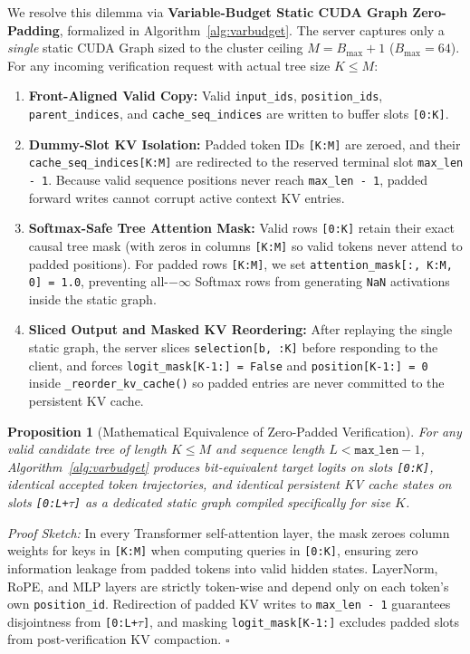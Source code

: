 \documentclass[10pt,conference]{IEEEtran}
\newtheorem{proposition}{Proposition}
\begin{document}
We resolve this dilemma via \textbf{Variable-Budget Static CUDA Graph Zero-Padding}, formalized in Algorithm~\ref{alg:varbudget}. The server captures only a \emph{single} static CUDA Graph sized to the cluster ceiling $M = B_{\max} + 1$ ($B_{\max}{=}64$). For any incoming verification request with actual tree size $K \le M$:
\begin{enumerate}
  \item \textbf{Front-Aligned Valid Copy:} Valid \texttt{input\_ids}, \texttt{position\_ids}, \texttt{parent\_indices}, and \texttt{cache\_seq\_indices} are written to buffer slots \texttt{[0:K]}.
  \item \textbf{Dummy-Slot KV Isolation:} Padded token IDs \texttt{[K:M]} are zeroed, and their \texttt{cache\_seq\_indices[K:M]} are redirected to the reserved terminal slot \texttt{max\_len - 1}. Because valid sequence positions never reach \texttt{max\_len - 1}, padded forward writes cannot corrupt active context KV entries.
  \item \textbf{Softmax-Safe Tree Attention Mask:} Valid rows \texttt{[0:K]} retain their exact causal tree mask (with zeros in columns \texttt{[K:M]} so valid tokens never attend to padded positions). For padded rows \texttt{[K:M]}, we set \texttt{attention\_mask[:, K:M, 0] = 1.0}, preventing all-$-\infty$ Softmax rows from generating \texttt{NaN} activations inside the static graph.
  \item \textbf{Sliced Output and Masked KV Reordering:} After replaying the single static graph, the server slices \texttt{selection[b, :K]} before responding to the client, and forces \texttt{logit\_mask[K-1:] = False} and \texttt{position[K-1:] = 0} inside \texttt{\_reorder\_kv\_cache()} so padded entries are never committed to the persistent KV cache.
\end{enumerate}

\begin{proposition}[Mathematical Equivalence of Zero-Padded Verification]
For any valid candidate tree of length $K \le M$ and sequence length $L < \texttt{max\_len} - 1$, Algorithm~\ref{alg:varbudget} produces bit-equivalent target logits on slots \texttt{[0:K]}, identical accepted token trajectories, and identical persistent KV cache states on slots \texttt{[0:L+$\tau$]} as a dedicated static graph compiled specifically for size $K$.
\end{proposition}
\emph{Proof Sketch:} In every Transformer self-attention layer, the mask zeroes column weights for keys in \texttt{[K:M]} when computing queries in \texttt{[0:K]}, ensuring zero information leakage from padded tokens into valid hidden states. LayerNorm, RoPE, and MLP layers are strictly token-wise and depend only on each token's own \texttt{position\_id}. Redirection of padded KV writes to \texttt{max\_len - 1} guarantees disjointness from \texttt{[0:L+$\tau$]}, and masking \texttt{logit\_mask[K-1:]} excludes padded slots from post-verification KV compaction. \hfill $\square$
\end{document}
